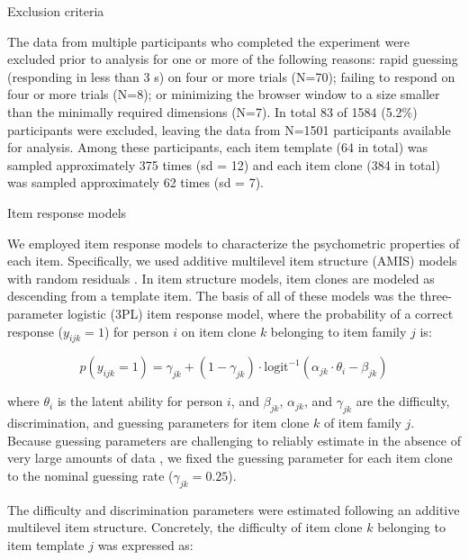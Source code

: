 \documentclass[a4paper,man,natbib]{apa6}
\makeatletter
\renewcommand{\subsubsection}{\@startsection{subsubsection}{3}
  {\z@}%
  {\b@level@two@skip}{\e@level@two@skip}%
  {\normalfont\normalsize\bfseries}}
\makeatother
\begin{document}
\subsubsection{Exclusion criteria}

The data from multiple participants who completed the experiment were excluded prior to analysis for one or more of the following reasons: rapid guessing (responding in less than 3 s) on four or more trials (N=70); failing to respond on four or more trials (N=8); or minimizing the browser window to a size smaller than the minimally required dimensions (N=7). In total 83 of 1584 (5.2\%) participants were excluded, leaving the data from N=1501 participants available for analysis. Among these participants, each item template (64 in total) was sampled approximately 375 times (sd = 12) and each item clone (384 in total) was sampled approximately 62 times (sd = 7). 

\subsubsection{Item response models}

We employed item response models to characterize the psychometric properties of each item. Specifically, we used additive multilevel item structure (AMIS) models with random residuals \citep{geerlings2011modeling, cho2014additive, lathrop2017item}. In item structure models, item clones are modeled as descending from a template item. The basis of all of these models was the three-parameter logistic (3PL) item response model, where the probability of a correct response ($y_{ijk} = 1$) for person $i$ on item clone $k$ belonging to item family $j$ is:

\begin{equation} \label{eq:1}
p(y_{ijk} = 1) = \gamma_{jk} + (1-\gamma_{jk}) \cdot \text{logit}^{-1} \left( \alpha_{jk} \cdot \theta_i - \beta_{jk} \right)
\end{equation}

\noindent where $\theta_i$ is the latent ability for person $i$, and $\beta_{jk}$, $\alpha_{jk}$, and $\gamma_{jk}$ are the difficulty, discrimination, and guessing parameters for item clone $k$ of item family $j$. Because guessing parameters are challenging to reliably estimate in the absence of very large amounts of data \citep{han2012fixing}, we fixed the guessing parameter for each item clone to the nominal guessing rate ($\gamma_{jk} = 0.25$).

The difficulty and discrimination parameters were estimated following an additive multilevel item structure. Concretely, the difficulty of item clone $k$ belonging to item template $j$ was expressed as:  
\end{document}
